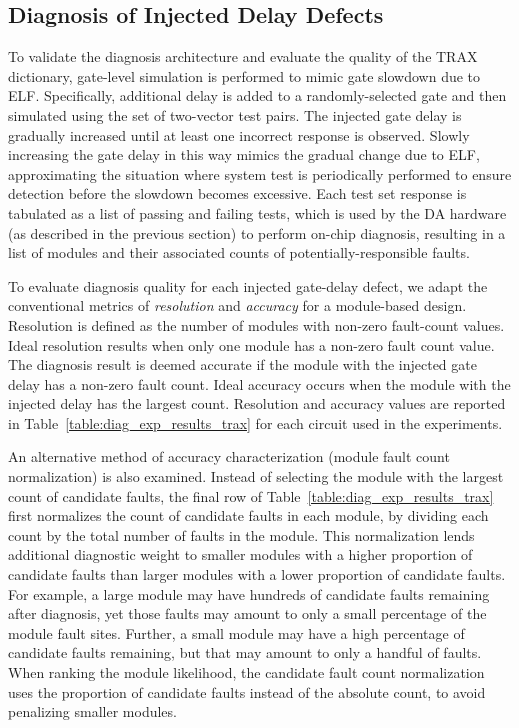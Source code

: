 \subsection{Diagnosis of Injected Delay Defects}
\label{sec:diag_exp_diag}

To validate the diagnosis architecture and evaluate the quality of the TRAX dictionary, gate-level simulation is performed to mimic gate slowdown due to ELF.
%
Specifically, additional delay is added to a randomly-selected gate and then simulated using the set of two-vector test pairs.
%
The injected gate delay is gradually increased until at least one incorrect response is observed.
%
Slowly increasing the gate delay in this way mimics the gradual change due to ELF, approximating the situation where system test is periodically performed to ensure detection before the slowdown becomes excessive.
%
Each test set response is tabulated as a list of passing and failing tests, which is used by the DA hardware (as described in the previous section) to perform on-chip diagnosis, resulting in a list of modules and their associated counts of potentially-responsible faults.

To evaluate diagnosis quality for each injected gate-delay defect, we adapt the conventional metrics of \textit{resolution} and \textit{accuracy} for a module-based design.
%
Resolution is defined as the number of modules with non-zero fault-count values.
%
Ideal resolution results when only one module has a non-zero fault count value.
%
The diagnosis result is deemed accurate if the module with the injected gate delay has a non-zero fault count.
%
Ideal accuracy occurs when the module with the injected delay has the largest count.
%
Resolution and accuracy values are reported in Table~\ref{table:diag_exp_results_trax} for each circuit used in the experiments.

An alternative method of accuracy characterization (module fault count normalization) is also examined.
%
Instead of selecting the module with the largest count of candidate faults, the final row of Table~\ref{table:diag_exp_results_trax} first normalizes the count of candidate faults in each module, by dividing each count by the total number of faults in the module.
%
This normalization lends additional diagnostic weight to smaller modules with a higher proportion of candidate faults than larger modules with a lower proportion of candidate faults.
%
For example, a large module may have hundreds of candidate faults remaining after diagnosis, yet those faults may amount to only a small percentage of the module fault sites.
%
Further, a small module may have a high percentage of candidate faults remaining, but that may amount to only a handful of faults.
%
When ranking the module likelihood, the candidate fault count normalization uses the proportion of candidate faults instead of the absolute count, to avoid penalizing smaller modules.

